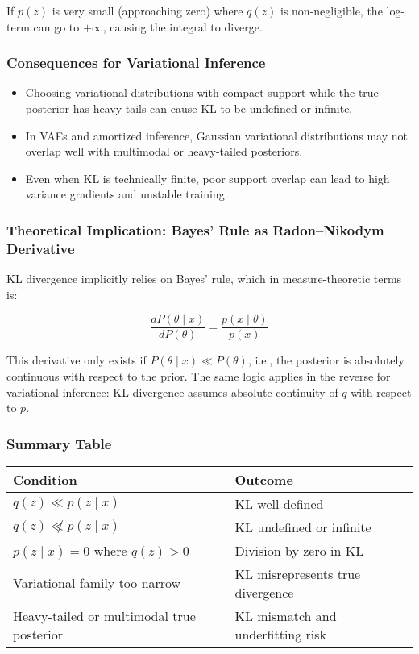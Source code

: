 If \( p(z) \) is very small (approaching zero) where \( q(z) \) is non-negligible, the log-term can go to \( +\infty \), causing the integral to diverge.

\subsubsection{Consequences for Variational Inference}

\begin{itemize}
    \item Choosing variational distributions with compact support while the true posterior has heavy tails can cause KL to be undefined or infinite.
    \item In VAEs and amortized inference, Gaussian variational distributions may not overlap well with multimodal or heavy-tailed posteriors.
    \item Even when KL is technically finite, poor support overlap can lead to high variance gradients and unstable training.
\end{itemize}

\subsubsection{Theoretical Implication: Bayes' Rule as Radon–Nikodym Derivative}

KL divergence implicitly relies on Bayes' rule, which in measure-theoretic terms is:

\[
\frac{dP(\theta \mid x)}{dP(\theta)} = \frac{p(x \mid \theta)}{p(x)}
\]

This derivative only exists if \( P(\theta \mid x) \ll P(\theta) \), i.e., the posterior is absolutely continuous with respect to the prior. The same logic applies in the reverse for variational inference: KL divergence assumes absolute continuity of \( q \) with respect to \( p \).

\subsubsection{Summary Table}

\begin{center}
\begin{tabular}{|l|l|}
\hline
\textbf{Condition} & \textbf{Outcome} \\
\hline
\( q(z) \ll p(z \mid x) \) & KL well-defined \\
\( q(z) \not\ll p(z \mid x) \) & KL undefined or infinite \\
\( p(z \mid x) = 0 \) where \( q(z) > 0 \) & Division by zero in KL \\
Variational family too narrow & KL misrepresents true divergence \\
Heavy-tailed or multimodal true posterior & KL mismatch and underfitting risk \\
\hline
\end{tabular}
\end{center}

